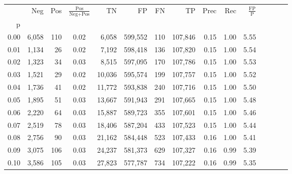 \begin{tabular}{rrrcrrrrrrrrrrr}
\toprule
{} &     Neg &    Pos & $\frac{\text{Pos}}{\text{Neg}+\text{Pos}}$ &       TN &       FP &       FN &       TP &  Prec &   Rec & $\frac{\text{FP}}{\text{P}}$ \\
p    &         &        &                                            &          &          &          &          &       &       &                              \\
\midrule
0.00 &   6,058 &    110 &                                       0.02 &    6,058 &  599,552 &      110 &  107,846 &  0.15 &  1.00 &                         5.55 \\
0.01 &   1,134 &     26 &                                       0.02 &    7,192 &  598,418 &      136 &  107,820 &  0.15 &  1.00 &                         5.54 \\
0.02 &   1,323 &     34 &                                       0.03 &    8,515 &  597,095 &      170 &  107,786 &  0.15 &  1.00 &                         5.53 \\
0.03 &   1,521 &     29 &                                       0.02 &   10,036 &  595,574 &      199 &  107,757 &  0.15 &  1.00 &                         5.52 \\
0.04 &   1,736 &     41 &                                       0.02 &   11,772 &  593,838 &      240 &  107,716 &  0.15 &  1.00 &                         5.50 \\
0.05 &   1,895 &     51 &                                       0.03 &   13,667 &  591,943 &      291 &  107,665 &  0.15 &  1.00 &                         5.48 \\
0.06 &   2,220 &     64 &                                       0.03 &   15,887 &  589,723 &      355 &  107,601 &  0.15 &  1.00 &                         5.46 \\
0.07 &   2,519 &     78 &                                       0.03 &   18,406 &  587,204 &      433 &  107,523 &  0.15 &  1.00 &                         5.44 \\
0.08 &   2,756 &     90 &                                       0.03 &   21,162 &  584,448 &      523 &  107,433 &  0.16 &  1.00 &                         5.41 \\
0.09 &   3,075 &    106 &                                       0.03 &   24,237 &  581,373 &      629 &  107,327 &  0.16 &  0.99 &                         5.39 \\
0.10 &   3,586 &    105 &                                       0.03 &   27,823 &  577,787 &      734 &  107,222 &  0.16 &  0.99 &                         5.35 \\

\end{tabular}
